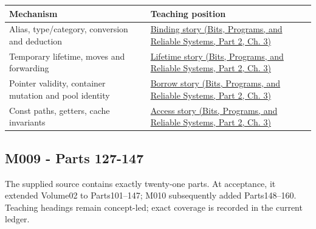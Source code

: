 {\def\LTcaptype{none} %
\begin{longtable}[]{@{}
  >{\raggedright\arraybackslash}p{}
  >{\raggedright\arraybackslash}p{}@{}}
\toprule\noalign{}
\begin{minipage}[b]{\linewidth}\raggedright
Mechanism
\end{minipage} & \begin{minipage}[b]{\linewidth}\raggedright
Teaching position
\end{minipage} \\
\midrule\noalign{}
\endhead
\bottomrule\noalign{}
\endlastfoot
Alias, type/category, conversion and deduction & \href{../01-Bits-Programs-and-Reliable-Systems-P02/main.pdf\#01-foundations-i-ch003-giving-another-name-to-a-live-object}{Binding story (Bits, Programs, and Reliable Systems, Part 2, Ch. 3)} \\
Temporary lifetime, moves and forwarding & \href{../01-Bits-Programs-and-Reliable-Systems-P02/main.pdf\#01-foundations-i-ch003-a-temporary-needs-an-explicit-lifetime-story}{Lifetime story (Bits, Programs, and Reliable Systems, Part 2, Ch. 3)} \\
Pointer validity, container mutation and pool identity & \href{../01-Bits-Programs-and-Reliable-Systems-P02/main.pdf\#01-foundations-i-ch003-when-a-valid-borrow-stops-naming-the-intended-thing}{Borrow story (Bits, Programs, and Reliable Systems, Part 2, Ch. 3)} \\
Const paths, getters, cache invariants & \href{../01-Bits-Programs-and-Reliable-Systems-P02/main.pdf\#01-foundations-i-ch003-read-only-is-a-path-not-an-ownership-or-synchronization-promise}{Access story (Bits, Programs, and Reliable Systems, Part 2, Ch. 3)} \\
\end{longtable}
}

\subsection{M009 - Parts 127-147}\label{appendix-fd090d982a15-m009---parts-127-147}

\hypertarget{appendix-fd090d982a15-m009---parts-127-147}{}

The supplied source contains exactly twenty-one parts. At acceptance, it extended Volume02 to Parts101--147; M010 subsequently added Parts148--160. Teaching headings remain concept-led; exact coverage is recorded in the current ledger.

